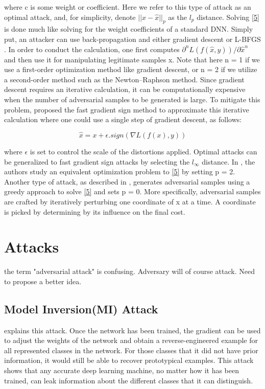 \documentclass{article}
\newcommand{\ach}[1]{{\color{red}#1}}
\begin{document}
where c is some weight or coefficient. Here we refer to this type of attack as an optimal attack, and, for simplicity, denote $||x − \hat{x}||_p$ as the $l_p$ distance. Solving \eqref{5} is done much like solving for the weight coefficients of a standard DNN. Simply put, an attacker can use back-propagation and either gradient descent \cite{szegedy2013intriguing} or L-BFGS \cite{carlini2017towards}. In order to conduct the calculation, one first computes $\partial^n L(f(\hat{x}, y)) / \partial \hat{x}^n$ and then use it for manipulating legitimate samples x. Note that here n = 1 if we use a first-order optimization method like gradient descent, or n = 2 if we utilize a second-order method such as the Newton–Raphson method. Since gradient descent requires an iterative calculation, it can be computationally expensive when the number of adversarial samples to be generated is large. To mitigate this problem, \cite{szegedy2013intriguing} proposed the fast gradient sign method to approximate this iterative calculation where one could use a single step of gradient descent, as follows:

\begin{equation}
	\hat{x} = x + \epsilon . sign(\nabla L(f(x), y))
\end{equation}

where $\epsilon$ is set to control the scale of the distortions applied. Optimal attacks can be generalized to fast gradient sign attacks by selecting the $l_\infty$ distance. In \cite{szegedy2013intriguing}, the authors study an equivalent optimization problem to \eqref{5} by setting p = 2. Another type of attack, as described in \cite{papernot2016limitations}, generates adversarial samples using a greedy approach to solve \eqref{5} and sets p = 0. More specifically, adversarial samples are crafted by iteratively perturbing one coordinate of x at a time. A coordinate is picked by determining by its influence on the final cost.
	
\section{Attacks}\label{attacks}
\ach{the term "adversarial attack" is confusing. Adversary will of course attack. Need to propose a better idea.}
\subsection{Model Inversion(MI) Attack}
\cite{wang2016learning} explains this attack. Once the network has been trained, the gradient can be used to adjust the weights of the network and obtain a reverse-engineered example for all represented classes in the network. For those classes that it did not have prior information, it would still be able to recover prototypical examples. This attack shows that any accurate deep learning machine, no matter how it has been trained, can leak information about the different classes that it can distinguish.
\end{document}
